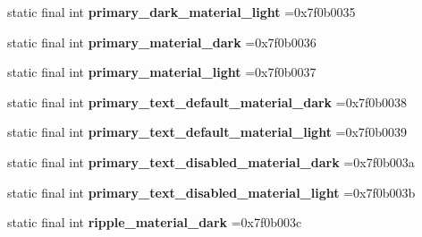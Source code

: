 \begin{DoxyCompactItemize}
\item 
\hypertarget{classcheck_1_1test_1_1_r_1_1color_ac2658dde1dee3a21c521e2b14a845f00}{}static final int {\bfseries primary\+\_\+dark\+\_\+material\+\_\+light} =0x7f0b0035\label{classcheck_1_1test_1_1_r_1_1color_ac2658dde1dee3a21c521e2b14a845f00}

\item 
\hypertarget{classcheck_1_1test_1_1_r_1_1color_a6eab02fbf32e9d02f33d85a2de000b48}{}static final int {\bfseries primary\+\_\+material\+\_\+dark} =0x7f0b0036\label{classcheck_1_1test_1_1_r_1_1color_a6eab02fbf32e9d02f33d85a2de000b48}

\item 
\hypertarget{classcheck_1_1test_1_1_r_1_1color_a55fec289550265f6c9226beb0745fc58}{}static final int {\bfseries primary\+\_\+material\+\_\+light} =0x7f0b0037\label{classcheck_1_1test_1_1_r_1_1color_a55fec289550265f6c9226beb0745fc58}

\item 
\hypertarget{classcheck_1_1test_1_1_r_1_1color_a4687b1970f044b8d8d1ed66f92ef24c2}{}static final int {\bfseries primary\+\_\+text\+\_\+default\+\_\+material\+\_\+dark} =0x7f0b0038\label{classcheck_1_1test_1_1_r_1_1color_a4687b1970f044b8d8d1ed66f92ef24c2}

\item 
\hypertarget{classcheck_1_1test_1_1_r_1_1color_ae3de2d80b34444109d239edd5e040d97}{}static final int {\bfseries primary\+\_\+text\+\_\+default\+\_\+material\+\_\+light} =0x7f0b0039\label{classcheck_1_1test_1_1_r_1_1color_ae3de2d80b34444109d239edd5e040d97}

\item 
\hypertarget{classcheck_1_1test_1_1_r_1_1color_a3dd759ad5979dd1165a5ea83be303c4a}{}static final int {\bfseries primary\+\_\+text\+\_\+disabled\+\_\+material\+\_\+dark} =0x7f0b003a\label{classcheck_1_1test_1_1_r_1_1color_a3dd759ad5979dd1165a5ea83be303c4a}

\item 
\hypertarget{classcheck_1_1test_1_1_r_1_1color_a9ef060fafda64de3c711d4bc6cd918d1}{}static final int {\bfseries primary\+\_\+text\+\_\+disabled\+\_\+material\+\_\+light} =0x7f0b003b\label{classcheck_1_1test_1_1_r_1_1color_a9ef060fafda64de3c711d4bc6cd918d1}

\item 
\hypertarget{classcheck_1_1test_1_1_r_1_1color_a7efee6eafcc26df6bcdc7132bd32f72d}{}static final int {\bfseries ripple\+\_\+material\+\_\+dark} =0x7f0b003c\label{classcheck_1_1test_1_1_r_1_1color_a7efee6eafcc26df6bcdc7132bd32f72d}


\end{DoxyCompactItemize}
